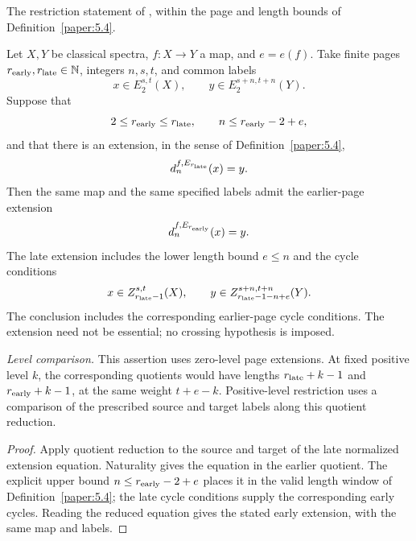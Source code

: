 \begin{theorem}
\label{sem:ProofTools:finite-extension-descent}
The restriction statement of \cite[Proposition 6.20, first assertion]{LWX126},
within the page and length bounds of Definition~\ref{paper:5.4}.\par

Let $X,Y$ be classical spectra, $f:X\to Y$ a map, and $e=e(f)$. Take finite pages $r_{\rm early},r_{\rm late}\in\mathbb N$, integers $n,s,t$, and common labels
\[
x\in E_2^{s,t}(X),\qquad y\in E_2^{s+n,t+n}(Y).
\]
Suppose that
\[
2\leq r_{\rm early}\leq r_{\rm late},\qquad
n\leq r_{\rm early}-2+e,
\]
and that there is an extension, in the sense of Definition~\ref{paper:5.4},
\[
d_n^{f,E_{r_{\rm late}}}(x)=y.
\]
Then the same map and the same specified labels admit the earlier-page extension
\[
d_n^{f,E_{r_{\rm early}}}(x)=y.
\]
The late extension includes the lower length bound $e\leq n$ and the cycle conditions
\[
x\in Z_{r_{\rm late}-1}^{s,t}(X),\qquad
y\in Z_{r_{\rm late}-1-n+e}^{s+n,t+n}(Y).
\]
The conclusion includes the corresponding earlier-page cycle conditions. The extension need not be essential; no crossing hypothesis is imposed.

\textit{Level comparison.}
This assertion uses zero-level page extensions. At fixed positive
level $k$, the corresponding quotients would have lengths
$r_{\rm late}+k-1$ and $r_{\rm early}+k-1$, at the same weight
$t+e-k$. Positive-level restriction uses a comparison of the prescribed source
and target labels along this quotient reduction.
\end{theorem}
\begin{proof}
Apply quotient reduction to the source and target of the late normalized extension equation. Naturality gives the equation in the earlier quotient. The explicit upper bound $n\le r_{\rm early}-2+e$ places it in the valid length window of Definition~\ref{paper:5.4}; the late cycle conditions supply the corresponding early cycles. Reading the reduced equation gives the stated early extension, with the same map and labels.
\end{proof}


